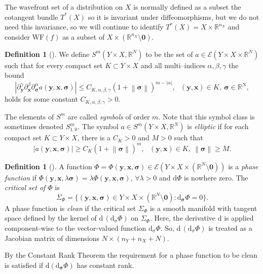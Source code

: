 \documentclass[a4paper,12pt]{amsart}
\numberwithin{equation}{section}
\theoremstyle{plain}
\numberwithin{theorem}{section}
\theoremstyle{definition}
\newtheorem{definition}[theorem]{Definition}
\theoremstyle{remark}
\theoremstyle{remark}
\theoremstyle{remark}
\newcommand{\smo}{\setminus \mathbf{0}}
\newcommand{\norm}[1]{\left\lVert#1\right\rVert}      %
\newcommand{\abs}[1]{\left|#1\right|}                 %
\newcommand{\paren}[1]{\left(#1\right)}               %
\newcommand{\dd}{\mathrm{d}}  %
\newcommand{\Ec}{\mathcal{E}}
\newcommand{\WF}{\mathrm{WF}}                         %
\newcommand{\vx}{{\mathbf{x}}}
\newcommand{\vy}{{\mathbf{y}}}
\newcommand{\vsig}{{\boldsymbol{\sigma}}} %
\newcommand{\rr}{{{\mathbb R}}}
\newcommand{\rn}{{{\mathbb R}^n}}
\newcommand{\bel}[1]{\begin{equation}\label{#1}}
\newcommand{\ee}{\end{equation}}
\begin{document}


The wavefront set of a distribution on $X$ is normally defined as a
subset the cotangent bundle $T^*(X)$ so it is invariant under
diffeomorphisms, but we do not need this invariance, so we will
continue to identify $T^*(X) = X \times \rr^{n_X}$ and consider $\WF(f)$ as
a subset of $X\times (\rr^{n_X}\smo)$.


 \begin{definition}[{\cite[Definition 7.8.1]{hormanderI}}] \label{ellip}We define
 $S^m(Y \times X, \mathbb{R}^N)$ to be the
set of $a\in \Ec(Y\times X\times \mathbb{R}^N)$ such that for every
compact set $K\subset Y\times X$ and all multi--indices $\alpha,
\beta, \gamma$ the bound
\[
\left|\partial^{\gamma}_{\vy}\partial^{\beta}_{\vx}\partial^{\alpha}_{\vsig}a(\vy,\vx,\vsig)\right|\leq
C_{K,\alpha,\beta,\gamma}(1+\norm{\vsig})^{m-|\alpha|},\ \ \ (\vy,\vx)\in K,\
\vsig\in\mathbb{R}^N,
\]
holds for some constant $C_{K,\alpha,\beta,\gamma}>0$. 

 The elements of $S^m$ are called \emph{symbols} of order $m$.  Note
that this symbol class is  sometimes denoted $S^m_{1,0}$.  The symbol
$a\in S^m(Y \times X,\rr^N)$ is \emph{elliptic} if for each compact set
$K\subset Y\times X$, there is a $C_K>0$ and $M>0$ such that
\bel{def:elliptic} \abs{a(\vy,\vx,\vsig)}\geq C_K(1+\norm{\vsig})^m,\
\ \ (\vy,\vx)\in K,\ \norm{\vsig}\geq M.
\ee 
\end{definition}



\begin{definition}[{\cite[Definition
        21.2.15]{hormanderIII}}] \label{phasedef}
A function $\Phi=\Phi(\vy,\vx,\vsig)\in
\Ec(Y\times X\times(\mathbb{R}^N\smo))$ is a \emph{phase
function} if $\Phi(\vy,\vx,\lambda\vsig)=\lambda\Phi(\vy,\vx,\vsig)$, $\forall
\lambda>0$ and $\mathrm{d}\Phi$ is nowhere zero. The
\emph{critical set of $\Phi$} is
\[\Sigma_\Phi=\{(\vy,\vx,\vsig)\in Y\times X\times(\mathbb{R}^N\smo)
: \dd_{\vsig}\Phi=0\}.\] 
 A phase function is
\emph{clean} if the critical set $\Sigma_\Phi$ is a smooth manifold {with tangent space defined {by} the kernel of $\mathrm{d}\,(\mathrm{d}_\sigma\Phi)$ on $\Sigma_\Phi$. Here, the derivative $\mathrm{d}$ is applied component-wise to the vector-valued function $\mathrm{d}_\sigma\Phi$. So, $\mathrm{d}\,(\mathrm{d}_\sigma\Phi)$ is treated as a Jacobian matrix of dimensions $N\times ({n_Y + n_X}+N)$.}
\end{definition}
\noindent By the {Constant Rank Theorem} \cite[Theorem 4.12]{lee2012smooth} the requirement for a phase
function to be clean is satisfied if
$\mathrm{d}\paren{\mathrm{d}_\vsig
\Phi}$ has constant rank.
\end{document}
